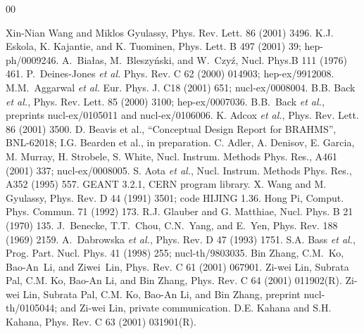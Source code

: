 \documentclass[singlespacing]{elsart}
\begin{document}
\begin{thebibliography}{00}




 Xin-Nian Wang and Miklos Gyulassy, 
Phys. Rev. Lett. 86 (2001) 3496.
 K.J. Eskola, K. Kajantie, and K. Tuominen, 
Phys. Lett. B 497 (2001) 39;
hep-ph/0009246.
 A.~Bia\l as, M.~Bleszy\'{n}ski, and W.~Czy\'{z}, 
Nucl. Phys.B 111 (1976) 461.
 P.~Deines-Jones {\it et al.} 
Phys. Rev. C 62 (2000) 014903; 
hep-ex/9912008.
 M.M.~Aggarwal {\it et al.} 
Eur. Phys. J. C18 (2001) 651; nucl-ex/0008004.
  B.B. Back {\it et al.}, 
Phys. Rev. Lett.
85  (2000) 3100; hep-ex/0007036. 
 B.B.~Back {\it et al.}, preprints nucl-ex/0105011 and
nucl-ex/0106006. 
 K. Adcox {\it et al.}, Phys. Rev. Lett.
86 (2001) 3500.
  D. Beavis et al., ``Conceptual Design Report for BRAHMS'', BNL-62018;
  I.G. Bearden et al., in preparation.   
 C. Adler, A. Denisov, E. Garcia, M. Murray, H. Strobele, 
S. White, Nucl. Instrum. Methods Phys. Res., A461 (2001) 337;
nucl-ex/0008005.
 S. Aota {\it et al.}, Nucl. Instrum. Methods Phys. Res., 
A352 (1995) 557.
 GEANT 3.2.1, CERN program library.
 X. Wang and M. Gyulassy, Phys. Rev. D  44 (1991) 3501;
code HIJING 1.36.
 Hong Pi, Comput. Phys. Commun.  71 (1992) 173. 
 R.J. Glauber and G. Matthiae, Nucl. Phys. B 21 
(1970) 135.
 J.~Benecke, T.T.~Chou, C.N.~Yang, and E.~Yen, 
Phys. Rev. 188 (1969) 2159.
 A.~Dabrowska {\it et al.}, Phys. Rev. D 47
(1993) 1751.
 S.A. Bass {\it et al.}, Prog. Part. Nucl. Phys. 
41 (1998) 255; nucl-th/9803035.
 Bin Zhang, C.M.~Ko, Bao-An~Li, and Ziwei~Lin,
Phys. Rev. C  61 (2001) 067901. 
 Zi-wei Lin, Subrata Pal, 
C.M. Ko, Bao-An Li, and Bin Zhang, Phys. Rev. C 64 (2001) 011902(R).
 Zi-wei Lin, Subrata Pal, C.M. Ko, Bao-An Li, and Bin Zhang,
preprint nucl-th/0105044; and Zi-wei Lin, private communication.
 D.E. Kahana and S.H. Kahana, Phys. Rev. C 63 (2001) 031901(R).


\end{thebibliography}
\end{document}
